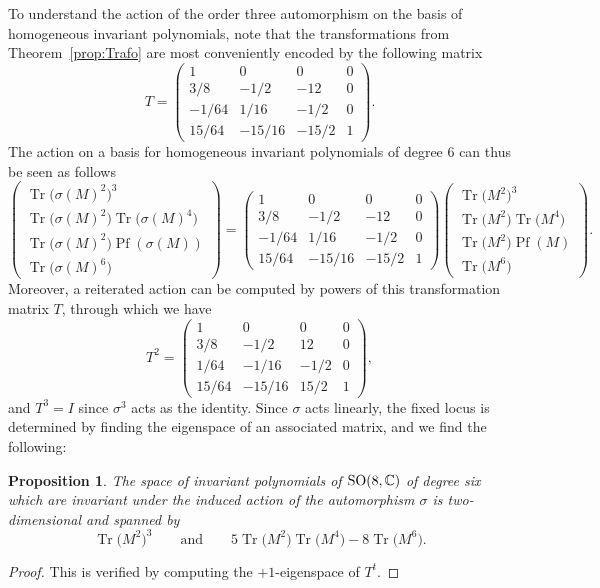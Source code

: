 \documentclass[pdftex]{sigma}
\numberwithin{equation}{section}
\newcommand{\Pf}{\operatorname{Pf}}
\newcommand{\Tr}{\operatorname{Tr}}
\newtheorem{Proposition}[Theorem]{Proposition}
 { \theoremstyle{definition}
\newtheorem{Definition}[Theorem]{Definition}
\newtheorem{Remark}[Theorem]{Remark} }
\begin{document}
To understand the action of the order three automorphism on the basis of homogeneous invariant polynomials, note that the transformations from Theorem~\ref{prop:Trafo} are most conveniently encoded by the following matrix
 \begin{equation*}%
 T=\begin{pmatrix}
1 & 0 & 0 & 0 \\
3/8 & -1/2 & -12 & 0 \\
-1/64 & 1/16 & -1/2 & 0 \\
15/64 & -15/16 & -15/2 & 1
\end{pmatrix}.
\end{equation*}
The action on a basis for homogeneous invariant polynomials of degree 6 can thus be seen as follows
\begin{equation*}
 \begin{pmatrix}
\Tr \big(\sigma(M)^2\big)^3\\ \Tr\big(\sigma(M)^2\big)\Tr\big(\sigma(M)^4\big) \\ \Tr\big(\sigma(M)^2\big) \Pf(\sigma(M)) \\ \Tr\big(\sigma(M)^6\big)
\end{pmatrix} =
\begin{pmatrix}
1 & 0 & 0 & 0 \\
3/8 & -1/2 & -12 & 0 \\
-1/64 & 1/16 & -1/2 & 0 \\
15/64 & -15/16 & -15/2 & 1
\end{pmatrix}
\begin{pmatrix}
\Tr \big(M^2\big)^3\\ \Tr\big(M^2\big)\Tr\big(M^4\big) \\ \Tr\big(M^2\big) \Pf(M) \\ \Tr\big(M^6\big)
\end{pmatrix}.
\end{equation*}
 Moreover, a reiterated action can be computed by powers of this transformation matrix $T$, through which we have
 \begin{equation*}
 T^2 = \begin{pmatrix}
1 & 0 & 0 & 0 \\
3/8 & -1/2 & 12 & 0 \\
1/64 & -1/16 & -1/2 & 0 \\
15/64 & -15/16 & 15/2 & 1
\end{pmatrix},
\end{equation*}
and $T^3 = I$ since $\sigma^3$ acts as the identity.
 Since $\sigma$ acts linearly, the fixed locus is determined by finding the eigenspace of an associated matrix, and we find the following:
 \begin{Proposition}\label{deg6}
 The space of invariant polynomials of ${\rm SO}(8,\mathbb{C})$ of degree six which are invariant under the induced action of the automorphism $\sigma$ is two-dimensional and spanned by \[\Tr\big(M^2\big)^3 \qquad \text{and}\qquad 5 \Tr\big(M^2\big) \Tr\big(M^4\big) - 8 \Tr \big(M^6\big).\]
 \end{Proposition}
 \begin{proof}
 This is verified by computing the $+1$-eigenspace of $T^t$.
 \end{proof}
\end{document}
